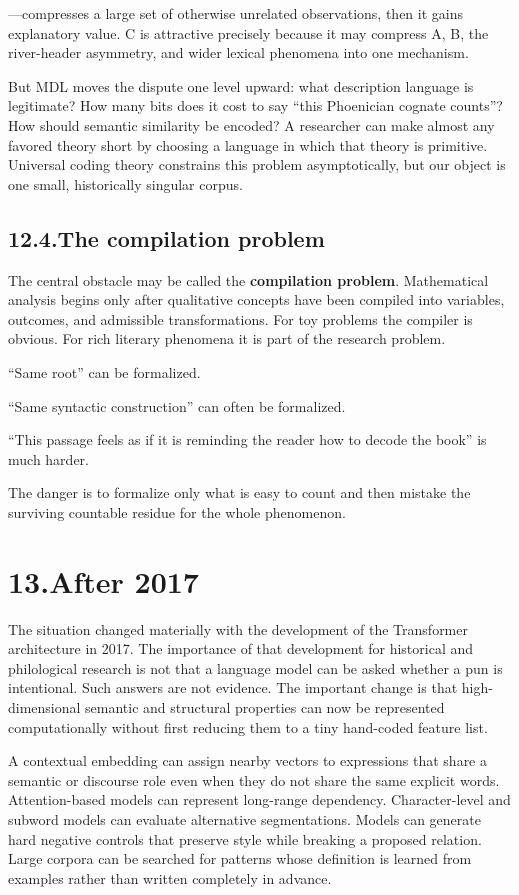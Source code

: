 ---compresses a large set of otherwise unrelated observations, then it gains explanatory value.  C is attractive precisely because it may compress A, B, the river-header asymmetry, and wider lexical phenomena into one mechanism.

But MDL moves the dispute one level upward: what description language is legitimate?  How many bits does it cost to say ``this Phoenician cognate counts''?  How should semantic similarity be encoded?  A researcher can make almost any favored theory short by choosing a language in which that theory is primitive.  Universal coding theory constrains this problem asymptotically, but our object is one small, historically singular corpus.

\subsection*{12.4.\quad The compilation problem}

The central obstacle may be called the \textbf{compilation problem}.  Mathematical analysis begins only after qualitative concepts have been compiled into variables, outcomes, and admissible transformations.  For toy problems the compiler is obvious.  For rich literary phenomena it is part of the research problem.

``Same root'' can be formalized.

``Same syntactic construction'' can often be formalized.

``This passage feels as if it is reminding the reader how to decode the book'' is much harder.

The danger is to formalize only what is easy to count and then mistake the surviving countable residue for the whole phenomenon.

\section*{13.\quad After 2017}

The situation changed materially with the development of the Transformer architecture in 2017.\cite{VaswaniEtAl2017}  The importance of that development for historical and philological research is not that a language model can be asked whether a pun is intentional.  Such answers are not evidence.  The important change is that high-dimensional semantic and structural properties can now be represented computationally without first reducing them to a tiny hand-coded feature list.

A contextual embedding can assign nearby vectors to expressions that share a semantic or discourse role even when they do not share the same explicit words.  Attention-based models can represent long-range dependency.  Character-level and subword models can evaluate alternative segmentations.  Models can generate hard negative controls that preserve style while breaking a proposed relation.  Large corpora can be searched for patterns whose definition is learned from examples rather than written completely in advance.


